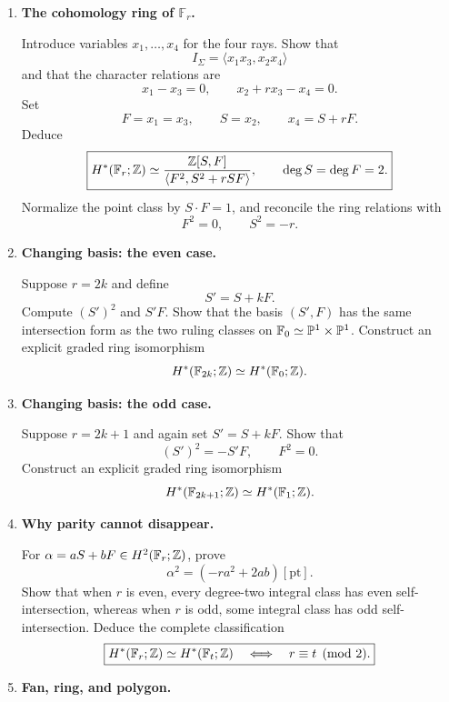 \begin{enumerate}[label=\textbf{Hint \arabic*.},wide=0pt]
\begin{enumerate}[label=(\alph*),wide=0pt]
\item For the Hirzebruch surface \(\mathbb F_r\), \(r\geq0\), use
\[
u_1=(1,0),\quad
u_2=(0,1),\quad
u_3=(-1,r),\quad
u_4=(0,-1).
\]
Show that
\[
D_1^2=D_3^2=0,
\qquad
D_2^2=-r,
\qquad
D_4^2=r.
\]
\end{enumerate}

\item \textbf{The cohomology ring of \(\mathbb F_r\).}

Introduce variables \(x_1,\ldots,x_4\) for the four rays. Show that
\[
I_\Sigma=\langle x_1x_3,x_2x_4\rangle
\]
and that the character relations are
\[
x_1-x_3=0,
\qquad
x_2+rx_3-x_4=0.
\]
Set
\[
F=x_1=x_3,
\qquad
S=x_2,
\qquad
x_4=S+rF.
\]
Deduce
\[
\boxed{
H^*(\mathbb F_r;\mathbb{Z})
\simeq
\frac{\mathbb{Z}[S,F]}{\langle F^2,S^2+rSF\rangle},
\qquad
\deg S=\deg F=2.
}
\]
Normalize the point class by \(S\cdot F=1\), and reconcile the ring
relations with
\[
F^2=0,
\qquad
S^2=-r.
\]

\item \textbf{Changing basis: the even case.}

Suppose \(r=2k\) and define
\[
S'=S+kF.
\]
Compute \((S')^2\) and \(S'F\). Show that the basis \((S',F)\) has
the same intersection form as the two ruling classes on
\(\mathbb F_0\simeq\mathbb{P}^1\times\mathbb{P}^1\). Construct an explicit graded
ring isomorphism
\[
H^*(\mathbb F_{2k};\mathbb{Z})
\simeq
H^*(\mathbb F_0;\mathbb{Z}).
\]

\item \textbf{Changing basis: the odd case.}

Suppose \(r=2k+1\) and again set \(S'=S+kF\). Show that
\[
(S')^2=-S'F,
\qquad
F^2=0.
\]
Construct an explicit graded ring isomorphism
\[
H^*(\mathbb F_{2k+1};\mathbb{Z})
\simeq
H^*(\mathbb F_1;\mathbb{Z}).
\]

\item \textbf{Why parity cannot disappear.}

For \(\alpha=aS+bF\in H^2(\mathbb F_r;\mathbb{Z})\), prove
\[
\alpha^2
=
(-ra^2+2ab)[\mathrm{pt}].
\]
Show that when \(r\) is even, every degree-two integral class has even
self-intersection, whereas when \(r\) is odd, some integral class has
odd self-intersection. Deduce the complete classification
\[
\boxed{
H^*(\mathbb F_r;\mathbb{Z})
\simeq
H^*(\mathbb F_t;\mathbb{Z})
\quad\Longleftrightarrow\quad
r\equiv t\pmod2.
}
\]

\item \textbf{Fan, ring, and polygon.}


\end{enumerate}
